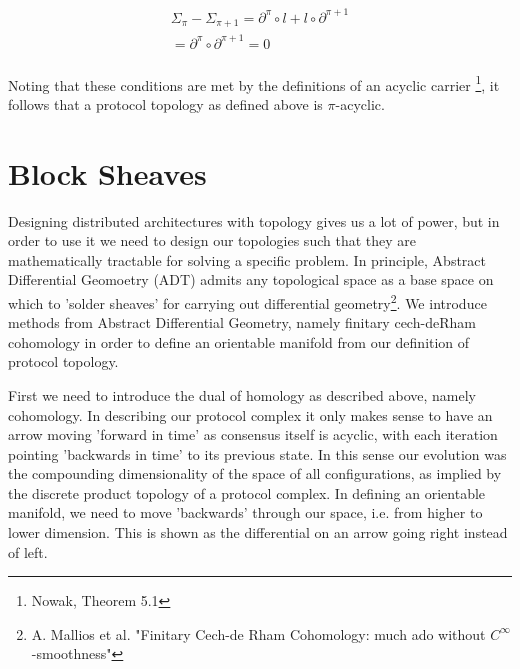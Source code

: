 \documentclass{article}
\begin{document}
\begin{equation} \label{eq1}
\begin{split}
\Sigma_\pi - \Sigma_{\pi+1} =  \partial^{\pi}\circ l + l \circ \partial^{\pi+1} \\
= \partial^\pi \circ \partial^{\pi+1} = 0 \\
\end{split}
\end{equation}

Noting that these conditions are met by the definitions of an acyclic carrier \footnote{Nowak, Theorem 5.1}, it follows that a protocol topology as defined above is $\pi$-acyclic.

\section{Block Sheaves}
Designing distributed architectures with topology gives us a lot of power, but in order to use it we need to design our topologies such that they are mathematically tractable for solving a specific problem. In principle, Abstract Differential Geomoetry (ADT) admits any topological space as a base space on which to 'solder sheaves' for carrying out differential geometry\footnote{A. Mallios et al. "Finitary Cech-de Rham Cohomology: much ado without $C^{\infty}$-smoothness"}. We introduce methods from Abstract Differential Geometry, namely finitary cech-deRham cohomology in order to define an orientable manifold from our definition of protocol topology.

First we need to introduce the dual of homology as described above, namely cohomology. In describing our protocol complex it only makes sense to have an arrow moving 'forward in time' as consensus itself is acyclic, with each iteration pointing 'backwards in time' to its previous state. In this sense our evolution was the compounding dimensionality of the space of all configurations, as implied by the discrete product topology of a protocol complex. In defining an orientable manifold, we need to move 'backwards' through our  space, i.e. from higher to lower dimension. This is shown as the differential on an arrow going right instead of left.
\end{document}
